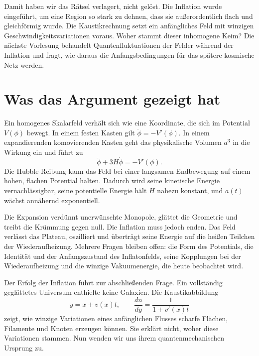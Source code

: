 Damit haben wir das Rätsel verlagert, nicht gelöst. Die Inflation wurde eingeführt, um eine Region so stark zu dehnen, dass sie außerordentlich flach und gleichförmig wurde. Die Kaustikrechnung setzt ein anfängliches Feld mit winzigen Geschwindigkeitsvariationen voraus. Woher stammt dieser inhomogene Keim? Die nächste Vorlesung behandelt Quantenfluktuationen der Felder während der Inflation und fragt, wie daraus die Anfangsbedingungen für das spätere kosmische Netz werden.

\section{Was das Argument gezeigt hat}

Ein homogenes Skalarfeld verhält sich wie eine Koordinate, die sich im Potential \(V(\phi)\) bewegt. In einem festen Kasten gilt \(\ddot\phi=-V'(\phi)\). In einem expandierenden komovierenden Kasten geht das physikalische Volumen \(a^3\) in die Wirkung ein und führt zu
\[
\ddot\phi+3H\dot\phi=-V'(\phi).
\]
Die Hubble-Reibung kann das Feld bei einer langsamen Endbewegung auf einem hohen, flachen Potential halten. Dadurch wird seine kinetische Energie vernachlässigbar, seine potentielle Energie hält \(H\) nahezu konstant, und \(a(t)\) wächst annähernd exponentiell.

Die Expansion verdünnt unerwünschte Monopole, glättet die Geometrie und treibt die Krümmung gegen null. Die Inflation muss jedoch enden. Das Feld verlässt das Plateau, oszilliert und überträgt seine Energie auf die heißen Teilchen der Wiederaufheizung. Mehrere Fragen bleiben offen: die Form des Potentials, die Identität und der Anfangszustand des Inflatonfelds, seine Kopplungen bei der Wiederaufheizung und die winzige Vakuumenergie, die heute beobachtet wird.

Der Erfolg der Inflation führt zur abschließenden Frage. Ein vollständig geglättetes Universum enthielte keine Galaxien. Die Kaustikabbildung
\[
y=x+v(x)t,
\qquad
\frac{dn}{dy}=\frac{1}{1+v'(x)t}
\]
zeigt, wie winzige Variationen eines anfänglichen Flusses scharfe Flächen, Filamente und Knoten erzeugen können. Sie erklärt nicht, woher diese Variationen stammen. Nun wenden wir uns ihrem quantenmechanischen Ursprung zu.